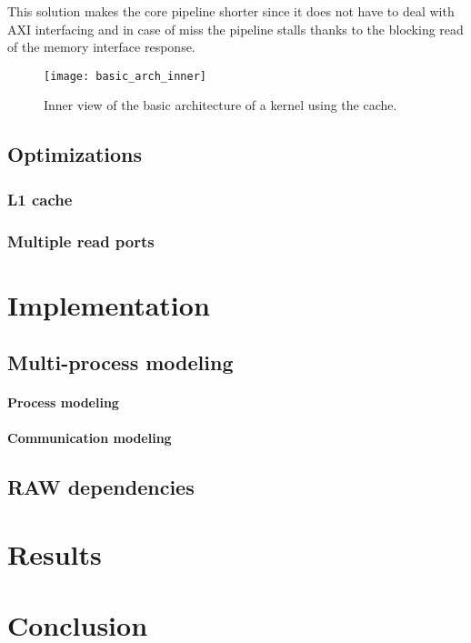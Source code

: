 \documentclass[11pt,a4paper]{memoir}
\begin{document}
This solution makes the core pipeline shorter since it does not have to deal
with AXI interfacing and in case of miss the pipeline stalls thanks to the
blocking read of the memory interface response.

\begin{figure}
	\centering
	\texttt{[image: basic\_arch\_inner]}
	\caption{Inner view of the basic architecture of a kernel using the cache.}
	\label{fig:basic_arch_inner}
\end{figure}

\section{Optimizations}
\subsection{L1 cache}
\subsection{Multiple read ports}

\chapter{Implementation}
\section{Multi-process modeling}
\subsubsection{Process modeling}
\subsubsection{Communication modeling}
\section{RAW dependencies}

\chapter{Results}
\chapter{Conclusion}
\end{document}
